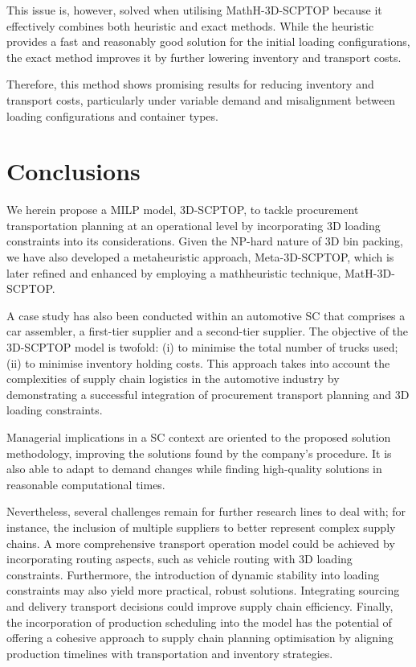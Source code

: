 This issue is, however, solved when utilising MathH-3D-SCPTOP because it effectively combines both heuristic and exact methods. While the heuristic provides a fast and reasonably good solution for the initial loading configurations, the exact method improves it by further lowering inventory and transport costs.

Therefore, this method shows promising results for reducing inventory and transport costs, particularly under variable demand and misalignment between loading configurations and container types.
\section{Conclusions}
We herein propose a MILP model, 3D-SCPTOP, to tackle procurement transportation planning at an operational level by incorporating 3D loading constraints into its considerations. Given the NP-hard nature of 3D bin packing, we have also developed a metaheuristic approach, Meta-3D-SCPTOP, which is later refined and enhanced by employing a mathheuristic technique, MatH-3D-SCPTOP.

A case study has also been conducted within an automotive SC that comprises a car assembler, a first-tier supplier and a second-tier supplier. The objective of the 3D-SCPTOP model is twofold: (i) to minimise the total number of trucks used; (ii) to minimise inventory holding costs. This approach takes into account the complexities of supply chain logistics in the automotive industry by demonstrating a successful integration of procurement transport planning and 3D loading constraints.

Managerial implications in a SC context are oriented to the proposed solution methodology, improving the solutions found by the company’s procedure. It is also able to adapt to demand changes while finding high-quality solutions in reasonable computational times.

Nevertheless, several challenges remain for further research lines to deal with; for instance, the inclusion of multiple suppliers to better represent complex supply chains. A more comprehensive transport operation model could be achieved by incorporating routing aspects, such as vehicle routing with 3D loading constraints. Furthermore, the introduction of dynamic stability into loading constraints may also yield more practical, robust solutions. Integrating sourcing and delivery transport decisions could improve supply chain efficiency. Finally, the incorporation of production scheduling into the model has the potential of offering a cohesive approach to supply chain planning optimisation by aligning production timelines with transportation and inventory strategies.


